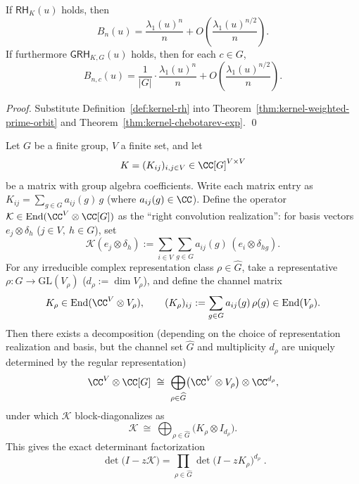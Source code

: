 \begin{corollary}\label{cor:kernel-rh-sqrt-error}
If $\textsf{RH}_K(u)$ holds, then
\[
B_n(u)=\frac{\lambda_1(u)^n}{n}+O\!\left(\frac{\lambda_1(u)^{n/2}}{n}\right).
\]
If furthermore $\textsf{GRH}_{K,G}(u)$ holds, then for each $c\in G$,
\[
B_{n,c}(u)=\frac{1}{|G|}\cdot\frac{\lambda_1(u)^n}{n}+O\!\left(\frac{\lambda_1(u)^{n/2}}{n}\right).
\]
\end{corollary}

\begin{proof}
Substitute Definition~\ref{def:kernel-rh} into Theorem~\ref{thm:kernel-weighted-prime-orbit} and Theorem~\ref{thm:kernel-chebotarev-exp}. \qed
\end{proof}

\begin{proposition}\label{prop:kernel-peter-weyl-block-diagonalization}
Let \(G\) be a finite group, \(V\) a finite set, and let
\[
K=(K_{ij})_{i,j\in V}\in \CC[G]^{V\times V}
\]
be a matrix with group algebra coefficients. Write each matrix entry as
\(
K_{ij}=\sum_{g\in G}a_{ij}(g)\,g
\)
(where \(a_{ij}(g)\in\CC\)).
Define the operator \(\mathcal{K}\in\mathrm{End}(\CC^{V}\otimes\CC[G])\) as the ``right convolution realization'':
for basis vectors \(e_j\otimes \delta_h\) (\(j\in V,\ h\in G\)), set
\[
\mathcal{K}(e_j\otimes \delta_h)
:=
\sum_{i\in V}\sum_{g\in G}a_{ij}(g)\,(e_i\otimes\delta_{hg}).
\]
For any irreducible complex representation class \(\rho\in\widehat G\), take a representative \(\rho:G\to\mathrm{GL}(V_\rho)\) (\(d_\rho:=\dim V_\rho\)), and define the channel matrix
\[
K_\rho\in \mathrm{End}(\CC^{V}\otimes V_\rho),
\qquad
(K_\rho)_{ij}:=\sum_{g\in G}a_{ij}(g)\,\rho(g)\in\mathrm{End}(V_\rho).
\]
Then there exists a decomposition (depending on the choice of representation realization and basis, but the channel set \(\widehat G\) and multiplicity \(d_\rho\) are uniquely determined by the regular representation)
\[
\CC^{V}\otimes\CC[G]
\ \cong\
\bigoplus_{\rho\in\widehat G}\bigl(\CC^{V}\otimes V_\rho\bigr)\otimes \CC^{d_\rho},
\]
under which \(\mathcal{K}\) block-diagonalizes as
\[
\mathcal{K}\ \cong\ \bigoplus_{\rho\in\widehat G}\bigl(K_\rho\otimes I_{d_\rho}\bigr).
\]
This gives the exact determinant factorization
\[
\boxed{\;
\det\!\bigl(I-z\mathcal{K}\bigr)
=\prod_{\rho\in\widehat G}\det\!\bigl(I-zK_\rho\bigr)^{d_\rho}\; }.
\]
\end{proposition}

